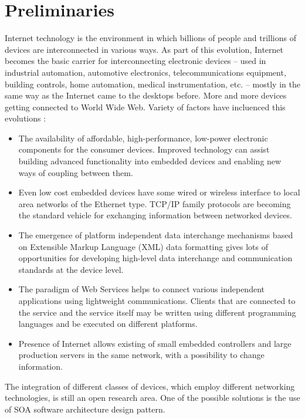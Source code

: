 \newpage
\section{Preliminaries}

Internet technology is the environment in which billions of people and trillions of
devices are interconnected in various ways.
As part of this evolution, Internet becomes the basic carrier
for interconnecting electronic devices – used in industrial
automation, automotive electronics, telecommunications
equipment, building controls, home automation, medical
instrumentation, etc. – mostly in the same way as the Internet came
to the desktops before. More and more devices getting connected to World Wide
Web. Variety of factors have incluenced  this evolutions \cite{4221180}:
\begin{itemize}
\item The availability of affordable, high-performance, low-power
electronic components for the consumer devices. Improved technology can assist
building  advanced functionality into embedded devices and enabling new ways of
coupling between them.
\item Even low cost embedded devices have some wired or wireless interface to local area
networks of the Ethernet type. TCP/IP family protocols are becoming the standard
vehicle for exchanging information between networked devices.
\item The emergence of platform independent data interchange mechanisms based on
Extensible Markup Language (XML) data formatting gives lots of opportunities for developing high-level data interchange and
communication standards at the device level.
\item The paradigm of Web Services  helps to connect various
independent applications using lightweight communications. Clients that are
connected to the service and the service itself may be written using different
programming languages and be executed on different platforms.
\item Presence of Internet allows existing of small embedded controllers and
large production servers in the same network, with a possibility to change
information.
\end{itemize}


The integration of different classes of devices, which employ different
networking technologies, is still an open research area. One of the possible
solutions is the use of SOA software architecture design pattern.



